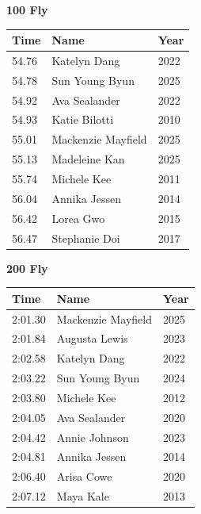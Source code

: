 \vspace{1.2em}
\noindent\begin{minipage}[t]{0.48\textwidth}
\centering
\textbf{\textcolor{teamprimary}{100 Fly}}\par
\vspace{0.5em}
\centering
\small
\renewcommand{\arraystretch}{1.0}
\setlength{\tabcolsep}{4pt}
\begin{tabular}{@{}p{1.8cm}p{3.0cm}p{1.0cm}@{}}
\toprule
\textbf{Time} & \textbf{Name} & \textbf{Year} \\
\midrule
54.76 & Katelyn Dang & 2022 \\
54.78 & Sun Young Byun & 2025 \\
54.92 & Ava Sealander & 2022 \\
54.93 & Katie Bilotti & 2010 \\
55.01 & Mackenzie Mayfield & 2025 \\
55.13 & Madeleine Kan & 2025 \\
55.74 & Michele Kee & 2011 \\
56.04 & Annika Jessen & 2014 \\
56.42 & Lorea Gwo & 2015 \\
56.47 & Stephanie Doi & 2017 \\
\bottomrule
\end{tabular}
\end{minipage}
\hfill
\begin{minipage}[t]{0.48\textwidth}
\centering
\textbf{\textcolor{teamprimary}{200 Fly}}\par
\vspace{0.5em}
\centering
\small
\renewcommand{\arraystretch}{1.0}
\setlength{\tabcolsep}{4pt}
\begin{tabular}{@{}p{1.8cm}p{3.0cm}p{1.0cm}@{}}
\toprule
\textbf{Time} & \textbf{Name} & \textbf{Year} \\
\midrule
2:01.30 & Mackenzie Mayfield & 2025 \\
2:01.84 & Augusta Lewis & 2023 \\
2:02.58 & Katelyn Dang & 2022 \\
2:03.22 & Sun Young Byun & 2024 \\
2:03.80 & Michele Kee & 2012 \\
2:04.05 & Ava Sealander & 2020 \\
2:04.42 & Annie Johnson & 2023 \\
2:04.81 & Annika Jessen & 2014 \\
2:06.40 & Arisa Cowe & 2020 \\
2:07.12 & Maya Kale & 2013 \\
\bottomrule
\end{tabular}
\end{minipage}
